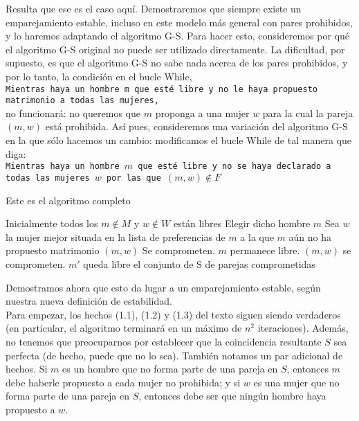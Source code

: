 \documentclass{article}
\begin{document}
Resulta que ese es el caso aquí. Demostraremos que siempre existe un emparejamiento estable, incluso en este modelo más general con pares prohibidos, y lo haremos adaptando el algoritmo G-S. Para hacer esto, consideremos por qué el algoritmo G-S original no puede ser utilizado directamente. La dificultad, por supuesto, es que el algoritmo G-S no sabe nada acerca de los pares prohibidos, y por lo tanto, la condición en el bucle While,\\

\texttt{Mientras haya un hombre m que esté libre y no le haya propuesto matrimonio a todas las mujeres,}\\

no funcionará: no queremos que $m$ proponga a una mujer $w$ para la cual la pareja $(m, w)$ está prohibida. Así pues, consideremos una variación del algoritmo G-S en la que sólo hacemos un cambio: modificamos el bucle While de tal manera que diga:\\

\texttt{Mientras haya un hombre $m$ que esté libre y no se haya declarado a todas las mujeres $w$ por las que $(m, w) \not\in F$}\\

\begin{algorithm}
\caption{Este es el algoritmo completo}\label{alg:cap}
\begin{algorithmic}
\State Inicialmente todos los $m \not\in M$ y $w \not\in W$ están libres
    \State Elegir dicho hombre $m$
    \State Sea $w$ la mujer mejor situada en la lista de preferencias de $m$
a la que $m$ aún no ha propuesto matrimonio
        \State $(m,w)$ Se comprometen.
    \Else {}
            \State $m$ permanece libre.
        \Else {}
            \State $(m, w)$ se comprometen.
            \State $m'$ queda libre
        \EndIf
    \EndIf
\EndWhile
\State \Return el conjunto de S de parejas comprometidas
\end{algorithmic}
\end{algorithm}

Demostramos ahora que esto da lugar a un emparejamiento estable, según nuestra nueva definición de estabilidad.\\

Para empezar, los hechos (1.1), (1.2) y (1.3) del texto siguen siendo verdaderos (en particular, el algoritmo terminará en un máximo de $n^2$ iteraciones). Además, no tenemos que preocuparnos por establecer que la coincidencia resultante $S$ sea perfecta (de hecho, puede que no lo sea). También notamos un par adicional de hechos. Si $m$ es un hombre que no forma parte de una pareja en $S$, entonces $m$ debe haberle propuesto a cada mujer no prohibida; y si $w$ es una mujer que no forma parte de una pareja en $S$, entonces debe ser que ningún hombre haya propuesto a $w$.\\
\end{document}
